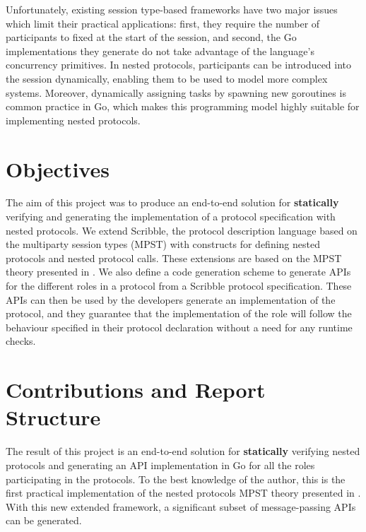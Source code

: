 \documentclass[12pt,twoside]{report}
\begin{document}
Unfortunately, existing session type-based frameworks have two major issues which limit their practical applications: first, they require the number of participants to fixed at the start of the session, and second, the Go implementations they generate do not take advantage of the language's concurrency primitives\cite{parametrictypes}. In nested protocols, participants can be introduced into the session dynamically, enabling them to be used to model more complex systems. Moreover, dynamically assigning tasks by spawning new goroutines is common practice in Go, which makes this programming model highly suitable for implementing nested protocols.


\section{Objectives}
The aim of this project was to produce an end-to-end solution for \textbf{statically} verifying and generating the implementation of a protocol specification with nested protocols. We extend Scribble\cite{scribble}, the protocol description language based on the multiparty session types (MPST) with constructs for defining nested protocols and nested protocol calls. These extensions are based on the MPST theory presented in \cite{nestedprotocols}. We also define a code generation scheme to generate APIs for the different roles in a protocol from a Scribble protocol specification. These APIs can then be used by the developers generate an implementation of the protocol, and they guarantee that the implementation of the role will follow the behaviour specified in their protocol declaration without a need for any runtime checks.

\section{Contributions and Report Structure}
The result of this project is an end-to-end solution for \textbf{statically} verifying nested protocols and generating an API implementation in Go for all the roles participating in the protocols. To the best knowledge of the author, this is the first practical implementation of the nested protocols MPST theory presented in \cite{nestedprotocols}. With this new extended framework, a significant subset of message-passing APIs can be generated.\\
\end{document}
